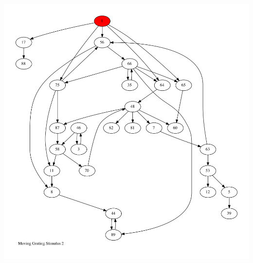 \documentclass{article}
\begin{document}
\newpage
\includegraphics[max height=\textheight,max width=\textwidth]{stim_mov_grat/stim2_pp.pdf}
\end{document}
